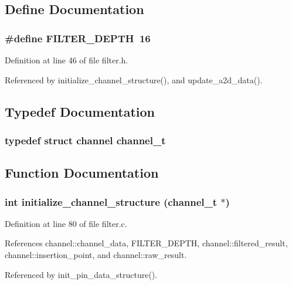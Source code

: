 \subsection{Define Documentation}
\subsubsection{\setlength{\rightskip}{0pt plus 5cm}\#define FILTER\_\-DEPTH~16}\label{filter_8h_a0}




Definition at line 46 of file filter.h.

Referenced by initialize\_\-channel\_\-structure(), and update\_\-a2d\_\-data().

\subsection{Typedef Documentation}
\subsubsection{\setlength{\rightskip}{0pt plus 5cm}typedef struct {\bf channel}  {\bf channel\_\-t}}\label{filter_8h_a1}




\subsection{Function Documentation}
\subsubsection{\setlength{\rightskip}{0pt plus 5cm}int initialize\_\-channel\_\-structure ({\bf channel\_\-t} $\ast$)}\label{filter_8h_a2}




Definition at line 80 of file filter.c.

References channel::channel\_\-data, FILTER\_\-DEPTH, channel::filtered\_\-result, channel::insertion\_\-point, and channel::raw\_\-result.

Referenced by init\_\-pin\_\-data\_\-structure().

